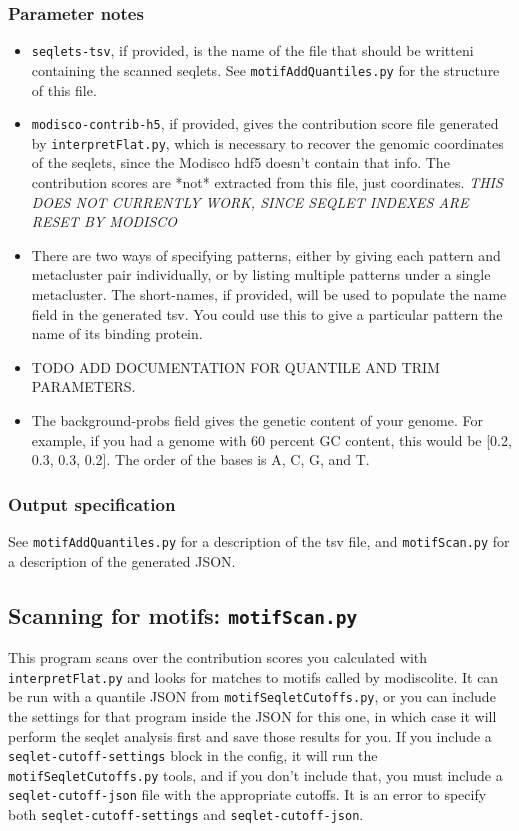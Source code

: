 \documentclass{article}
\begin{document}
\subsubsection{Parameter notes}
\begin{itemize}
    \item \texttt{seqlets-tsv}, if provided, is the name of the file that should be writteni
        containing the scanned seqlets.
        See \texttt{motifAddQuantiles.py} for the structure of this file.
    \item \texttt{modisco-contrib-h5}, if provided, gives the contribution score file
        generated by \texttt{interpretFlat.py}, which is necessary to recover the genomic
        coordinates of the seqlets, since the Modisco hdf5 doesn't contain that info.
        The contribution scores are *not* extracted from this file, just coordinates.
        \emph{THIS DOES NOT CURRENTLY WORK, SINCE SEQLET INDEXES ARE RESET BY MODISCO}
    \item There are two ways of specifying patterns, either by giving each pattern and
        metacluster pair individually, or by listing multiple patterns under a single
        metacluster.
        The short-names, if provided, will be used to populate the name field in the
        generated tsv.
        You could use this to give a particular pattern the name of its binding protein.
    \item TODO ADD DOCUMENTATION FOR QUANTILE AND TRIM PARAMETERS.
    \item The background-probs field gives the genetic content of your genome. For example, if
        you had a genome with 60 percent GC content, this would be [0.2, 0.3, 0.3, 0.2].
        The order of the bases is A, C, G, and T.
\end{itemize}

\subsubsection{Output specification}
See \texttt{motifAddQuantiles.py} for a description of the tsv file,
and \texttt{motifScan.py} for a description of the generated JSON.


\newpage


\subsection{Scanning for motifs: \texttt{motifScan.py}}

This program scans over the contribution scores you calculated with \texttt{interpretFlat.py}
and looks for matches to motifs called by modiscolite.
It can be run with a quantile JSON from \texttt{motifSeqletCutoffs.py}, or you can
include the settings for that program inside the JSON for this one, in which case it
will perform the seqlet analysis first and save those results for you.
If you include a \texttt{seqlet-cutoff-settings} block in the config, it will run
the \texttt{motifSeqletCutoffs.py} tools, and if you don't include that, you must include
a \texttt{seqlet-cutoff-json} file with the appropriate cutoffs.
It is an error to specify both \texttt{seqlet-cutoff-settings} and \texttt{seqlet-cutoff-json}.
\end{document}

